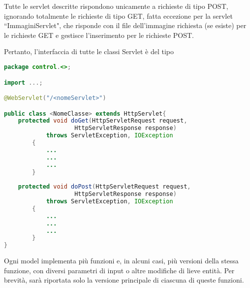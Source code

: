 \documentclass[12pt,a4paper]{article}
\begin{document}
Tutte le servlet descritte rispondono unicamente a richieste di tipo POST, ignorando totalmente le richieste di tipo GET, fatta eccezione per la servlet ``ImmaginiServlet", che risponde con il file dell'immagine richiesta (se esiste) per le richieste GET e gestisce l'inserimento per le richieste POST.

Pertanto, l'interfaccia di tutte le classi Servlet è del tipo

\begin{lstlisting}[language=Java]
package control.<>;

import ...;

@WebServlet("/<nomeServlet>")

public class <NomeClasse> extends HttpServlet{
	protected void doGet(HttpServletRequest request, 
					HttpServletResponse response)
			throws ServletException, IOException 
		{
			...
			...
			...
		}
	
	protected void doPost(HttpServletRequest request,
					HttpServletResponse response)
			throws ServletException, IOException 
		{
			...
			...
			...
		}
}
\end{lstlisting}

\newpage

Ogni model implementa più funzioni e, in alcuni casi, più versioni della stessa funzione, con diversi parametri di input o altre modifiche di lieve entità. Per brevità, sarà riportata solo la versione principale di ciascuna di queste funzioni.
\end{document}
